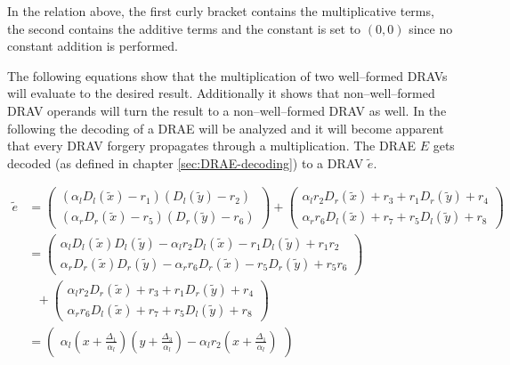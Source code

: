 \noindent{}In the relation above, the first curly bracket contains the
multiplicative terms, the second contains the additive terms and the constant is
set to $(0, 0)$ since no constant addition is performed.

The following equations show that the multiplication of two well--formed
DRAVs will evaluate to the desired result. Additionally it shows that
non--well--formed DRAV operands will turn the result to a non--well--formed DRAV
as well. In the following the decoding of a DRAE will be analyzed and it will
become apparent that every DRAV forgery propagates through a
multiplication. The DRAE $E$ gets decoded (as defined in chapter
\ref{sec:DRAE-decoding}) to a DRAV $\widetilde{e}$.

\begin{align*}
  \widetilde{e} & =
  \begin{pmatrix}
    (\alpha_l D_l(\widetilde{x})-r_1)
    (         D_l(\widetilde{y})-r_2) \\
    (\alpha_r D_r(\widetilde{x})-r_5)
    (         D_r(\widetilde{y})-r_6)
  \end{pmatrix}
  +
  \begin{pmatrix}
    \alpha_lr_2 D_r(\widetilde{x}) + r_3 +
    r_1         D_r(\widetilde{y}) + r_4 \\
    \alpha_rr_6 D_l(\widetilde{x}) + r_7 +
    r_5         D_l(\widetilde{y}) + r_8
  \end{pmatrix} \\
%
  & =
  \begin{pmatrix}
    \alpha_l     D_l(\widetilde{x}) D_l(\widetilde{y})
    -\alpha_lr_2 D_l(\widetilde{x})
    -r_1         D_l(\widetilde{y})
    +r_1r_2 \\
    \alpha_r     D_r(\widetilde{x}) D_r(\widetilde{y})
    -\alpha_rr_6 D_r(\widetilde{x})
    -r_5         D_r(\widetilde{y})
    +r_5r_6
  \end{pmatrix} \\
  &\ \ \ +
  \begin{pmatrix}
    \alpha_lr_2 D_r(\widetilde{x}) + r_3 +
    r_1         D_r(\widetilde{y}) + r_4 \\
    \alpha_rr_6 D_l(\widetilde{x}) + r_7 +
    r_5         D_l(\widetilde{y}) + r_8
  \end{pmatrix} \\
%
  & =
  \begin{pmatrix}
    \alpha_l     \left(x + \frac{\Delta_1}{\alpha_l}\right)
                 \left(y + \frac{\Delta_3}{\alpha_l}\right)
    -\alpha_lr_2 \left(x + \frac{\Delta_1}{\alpha_l}\right)

\end{pmatrix}
\end{align*}
